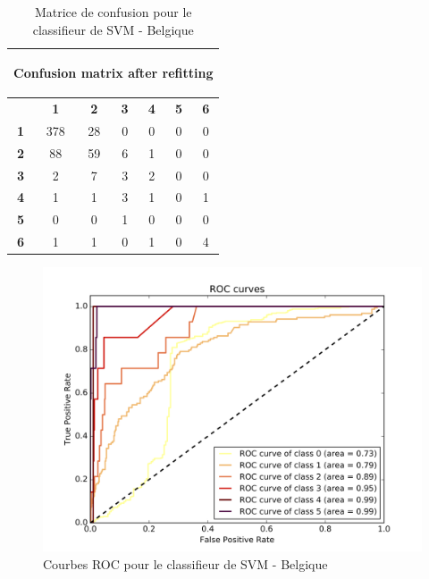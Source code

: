 \documentclass{book}
\begin{document}
\begin{table}[H]
  \begin{center}
  \begin{adjustbox}{max width=\textwidth}
  \begin{tabular}{|c|c|c|c|c|c|c|}
    \hline
    \multicolumn{7}{|c|}{{ \begin{bf}Confusion matrix after refitting\end{bf}}} \\
    \hline
     & \textbf{1} & \textbf{2} & \textbf{3} & \textbf{4} & \textbf{5} & \textbf{6}\\
    \hline
    \textbf{1} & 378 & 28 & 0 & 0 & 0 & 0\\
    \hline
    \textbf{2} & 88 & 59 & 6 & 1 & 0 & 0\\
    \hline
    \textbf{3} & 2 & 7 & 3 & 2 & 0 & 0\\
    \hline
    \textbf{4} & 1 & 1 & 3 & 1 & 0 & 1\\
    \hline
    \textbf{5} & 0 & 0 & 1 & 0 & 0 & 0\\
    \hline
    \textbf{6} & 1 & 1 & 0 & 1 & 0 & 4\\
    \hline
  \end{tabular}
  \end{adjustbox}
  \end{center}
  \caption{Matrice de confusion pour le classifieur de SVM - Belgique}
  \label{svm_cm_belgique}
\end{table}

\begin{figure}[H]
 \begin{center}
\includegraphics[scale=0.4]{../../data/Belgique/test/Support_Vector_Gaussian_Classification/Support_Vector_Gaussian_Classification_roc.png}
 \end{center}
 \caption{Courbes ROC pour le classifieur de SVM - Belgique}
 \label{svm_roc_belgique}
\end{figure}
\end{document}
